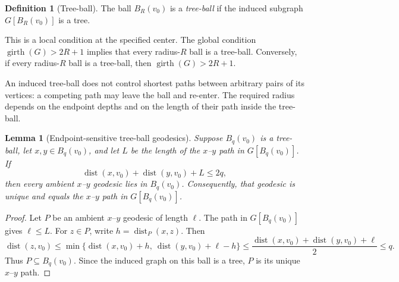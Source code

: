 \documentclass[11pt]{amsart}
\newtheorem{lemma}[theorem]{Lemma}
\theoremstyle{definition}
\newtheorem{definition}[theorem]{Definition}
\DeclareMathOperator{\dist}{dist}
\begin{document}
\begin{definition}[Tree-ball]
\label{def:tree-ball}
The ball $B_R(v_0)$ is a \emph{tree-ball} if the induced subgraph $G[B_R(v_0)]$ is a tree.
\end{definition}

This is a local condition at the specified center. The global condition $\operatorname{girth}(G)>2R+1$ implies that every radius-$R$ ball is a tree-ball. Conversely, if every radius-$R$ ball is a tree-ball, then $\operatorname{girth}(G)>2R+1$.

An induced tree-ball does not control shortest paths between arbitrary pairs of its vertices: a competing path may leave the ball and re-enter. The required radius depends on the endpoint depths and on the length of their path inside the tree-ball.

\begin{lemma}[Endpoint-sensitive tree-ball geodesics]
\label{lem:buffer}
Suppose $B_q(v_0)$ is a tree-ball, let $x,y\in B_q(v_0)$, and let $L$ be the length of the $x$--$y$ path in $G[B_q(v_0)]$. If
\[
\dist(x,v_0)+\dist(y,v_0)+L\leq 2q,
\]
then every ambient $x$--$y$ geodesic lies in $B_q(v_0)$. Consequently, that geodesic is unique and equals the $x$--$y$ path in $G[B_q(v_0)]$.
\end{lemma}

\begin{proof}
Let $P$ be an ambient $x$--$y$ geodesic of length $\ell$. The path in $G[B_q(v_0)]$ gives $\ell\leq L$. For $z\in P$, write $h=\dist_P(x,z)$. Then
\[
\dist(z,v_0)
\leq \min\{\dist(x,v_0)+h,\ \dist(y,v_0)+\ell-h\}
\leq \frac{\dist(x,v_0)+\dist(y,v_0)+\ell}{2}
\leq q.
\]
Thus $P\subseteq B_q(v_0)$. Since the induced graph on this ball is a tree, $P$ is its unique $x$--$y$ path.
\end{proof}
\end{document}
